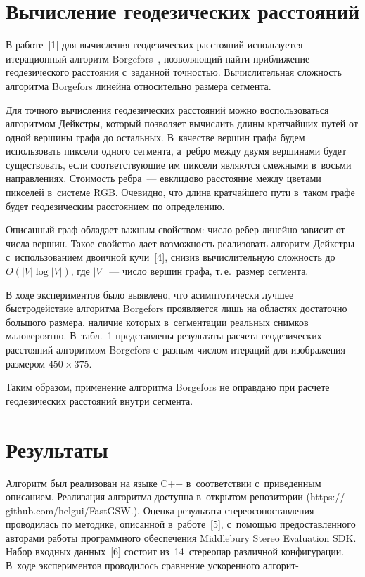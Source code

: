 \begin{multicols}{2}
\section{Вычисление геодезических расстояний}

  В работе~[1] для вычисления геодезических расстояний используется 
итерационный алгоритм Borgefors~\cite{3-ya}, позволяющий найти 
приближение геодезического расстояния с~заданной точностью. 
Вычислительная сложность алгоритма Borgefors линейна относительно размера 
сегмента.
  
  Для точного вычисления геодезических расстояний можно воспользоваться 
алгоритмом Дейкстры, который позволяет вычислить длины кратчайших путей 
от одной вершины графа до остальных. В~качестве вершин графа будем 
использовать пиксели одного сегмента, а~ребро между двумя вершинами будет 
существовать, если соответствующие им пиксели являются смежными в~восьми 
направлениях. Стоимость ребра~--- евклидово расстояние между цветами 
пикселей в~системе RGB. Очевидно, что длина кратчайшего пути в~таком графе 
будет геодезическим расстоянием по определению.
  
  Описанный граф обладает важным свойством: число ребер линейно зависит 
от числа вершин. Такое свойство дает возможность реализовать алгоритм 
Дейкстры с~использованием двоичной кучи~[4], снизив вычислительную 
сложность до $O(\vert V\vert \log \vert V \vert )$, где $\vert V\vert$~--- чис\-ло 
вершин графа, т.\,е.\ размер сегмента.
  
  В ходе экспериментов было выявлено, что асимптотически лучшее 
быстродействие алгоритма Borgefors проявляется лишь на областях достаточно 
большого размера, наличие которых в~сегментации реальных снимков 
маловероятно. В~табл.~1 представлены результаты расчета геодезических 
расстояний алгоритмом Borgefors с~разным числом итераций для изображения 
размером $450\times 375$.




  Таким образом, применение алгоритма Borgefors не оправдано при расчете 
геодезических расстояний внутри сегмента.

\vspace*{-12pt}

\section{Результаты}

  Алгоритм был реализован на языке C++ в~соответствии с~приведенным 
описанием. Реализация алгоритма доступна в~открытом 
репозитории ({\sf https:// github.com/helgui/FastGSW.}). Оценка результата 
стереосопоставления проводилась по методике, описанной в~работе~[5], 
с~по\-мощью предоставленного авторами работы программного обеспе\-чения 
Middlebury Stereo 
Evaluation SDK. %
  Набор входных данных~[6] состоит из~14~стереопар различной 
конфигурации. В~ходе экспериментов проводилось сравнение ускоренного 
алгорит-\linebreak\vspace*{-12pt}




\end{multicols}

